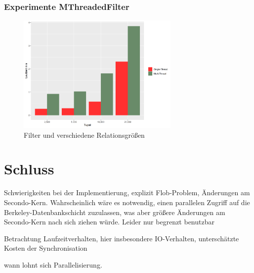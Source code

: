 \documentclass[a4paper,12pt,twoside]{article}
\begin{document}
\subsubsection{Experimente MThreadedFilter}

\begin{figure}
	\centering
	\includegraphics[width=0.70\textwidth]{Bilder/filter_head.png}
	\caption{Filter und verschiedene Relationsgrößen}
	\label{img:filterHead}
\end{figure}

\section{Schluss}

Schwierigkeiten bei der Implementierung, explizit Flob-Problem, Änderungen am Secondo-Kern. Wahrscheinlich wäre es notwendig, einen parallelen Zugriff auf die Berkeley-Datenbankschicht zuzulassen, was aber größere Änderungen am Secondo-Kern nach sich ziehen würde. Leider nur begrenzt benutzbar

Betrachtung Laufzeitverhalten, hier insbesondere IO-Verhalten, unterschätzte Kosten der Synchronisation

wann lohnt sich Parallelisierung.



\pagebreak 
\printbibliography
\end{document}
